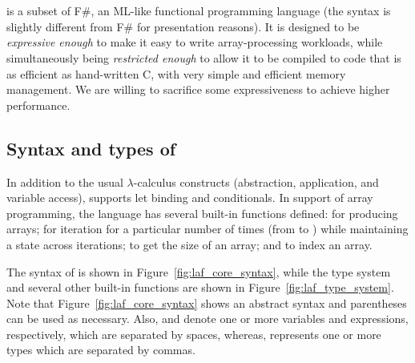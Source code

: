 \section{\lafsharp}
\label{sec:lafsharp}







\lafsharp{} is a subset of F\#, an ML-like functional programming language (the syntax is slightly different from F\# for presentation reasons).  It is designed to be \emph{expressive enough} to make it easy to write array-processing workloads, while simultaneously being \emph{restricted enough} to allow it to be compiled to code that is as efficient as hand-written C, with very simple and efficient memory management.  We are willing to sacrifice some expressiveness to achieve higher performance. 

\subsection{Syntax and types of \lafsharp{}}
In addition to the usual $\lambda$-calculus constructs (abstraction, application, and variable access), \lafsharp{} supports let binding and conditionals.  In support of array programming, the language
has several built-in functions defined: \vbuildk{} for producing arrays;  \viteratek{} for iteration for a particular number of times (from  to ) while maintaining a state across iterations; \vclength{} to get the size of an array; and \vcget{} to index an array. 

The syntax of \lafsharp{} is shown in Figure~\ref{fig:laf_core_syntax}, while the type system and several other built-in functions are shown in Figure~\ref{fig:laf_type_system}. 
Note that Figure~\ref{fig:laf_core_syntax} shows an abstract syntax and parentheses can be used as necessary. Also,  and \vmore{\expr} denote one or more variables and expressions, respectively, which are separated by spaces, whereas, \vmore{\typet} represents one or more types which are separated by commas.

